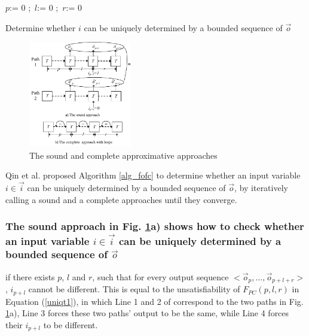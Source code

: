 \documentclass[conference]{IEEEtran}
\begin{document}
\begin{algorithm}[b]
\SetAlgoVlined
{}
$p$:= 0 ;~$l$:= 0 ;~$r$:= 0 \;
\caption{Determine whether $i$ can be uniquely determined by a bounded sequence of $\vec{o}$}
\label{alg_fofc}
\end{algorithm}

\begin{figure}[t]
\begin{center}
\includegraphics[width=0.4\textwidth]{pc}
\end{center}
\caption{The sound and complete approximative approaches}
  \label{fig_pc}
\end{figure}

Qin et al. \cite{QinTODAES15} proposed Algorithm \ref{alg_fofc}
to determine whether an input variable $i\in\vec{i}$ can be uniquely determined by a bounded sequence of $\vec{o}$,
by iteratively calling 
a sound and a complete approaches until they converge.

\subsubsection{The sound approach in Fig. \ref{fig_pc}a) shows how to check whether
an input variable $i\in\vec{i}$ can be uniquely determined by a bounded sequence of $\vec{o}$}\label{subsub_sound}
if there exists $p$, $l$ and $r$,
such that for every output sequence $<\vec{o}_p,\dots,\vec{o}_{p+l+r}>$,
$i_{p+l}$ cannot be different.
This is equal to the unsatisfiability of $F_{PC}(p,l,r)$ in Equation (\ref{uniqt1}),
in which Line 1 and 2 of correspond to the two paths in Fig. \ref{fig_pc}a),
Line 3 forces these two paths' output to be the same,
while Line 4 forces their $i_{p+l}$ to be different.
\end{document}
